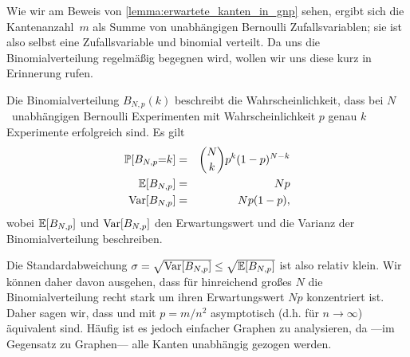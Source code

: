 \bigskip

Wie wir am Beweis von \cref{lemma:erwartete_kanten_in_gnp} sehen, ergibt sich die Kantenanzahl~$m$ als Summe von unabhängigen Bernoulli Zufallsvariablen;
sie ist also selbst eine Zufallsvariable und binomial verteilt.
Da uns die Binomialverteilung regelmäßig begegnen wird, wollen wir uns diese kurz in Erinnerung rufen.
\begin{definition}
    Die  Binomialverteilung $B_{N, p}(k)$ beschreibt die Wahrscheinlichkeit, dass bei $N$~unabhängigen Bernoulli Experimenten mit Wahrscheinlichkeit $p$ genau $k$ Experimente erfolgreich sind.
    Es gilt 
    \begin{eqnarray*}
        \mathbb{P}\!\left[B_{N,p} {=} k\right] &=& \binom{N}{k} p^k (1-p)^{N-k} \\
        \mathbb{E}\!\left[B_{N,p}\right] &=& Np \\
        \operatorname{Var}\!\left[B_{N,p}\right] &=& Np(1-p),
    \end{eqnarray*}
    wobei $\mathbb{E}\!\left[B_{N,p}\right]$ und $\operatorname{Var}\!\left[B_{N,p}\right]$ den Erwartungswert und die Varianz der Binomialverteilung beschreiben.
\end{definition}

Die Standardabweichung $\sigma = \sqrt{\operatorname{Var}\!\left[B_{N,p}\right]} \le \sqrt{\mathbb{E}\!\left[B_{N,p}\right]}$ ist also relativ klein.
Wir können daher davon ausgehen, dass für hinreichend großes $N$ die Binomialverteilung recht stark um ihren Erwartungswert $Np$ konzentriert ist.
Daher sagen wir, dass \Gnm und \Gnp mit $p=m/n^2$ asymptotisch (d.h. für $n \to \infty$) äquivalent sind.
Häufig ist es jedoch einfacher \Gnp Graphen zu analysieren, da ---im Gegensatz zu \Gnm Graphen--- alle Kanten unabhängig gezogen werden.

